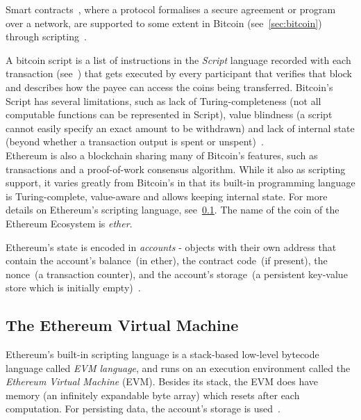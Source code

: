 Smart contracts~\cite{szabo1997smart-contracts}, where a protocol formalises a secure agreement or program over a
network, are supported to some extent in Bitcoin (see~\ref{sec:bitcoin}) through scripting~\cite{bitcoinwiki-scripts}.

A bitcoin script is a list of instructions in the \textit{Script} language recorded with each transaction
(see~) that gets executed by every participant that verifies that block and describes how the
payee can access the coins being transferred.
Bitcoin's Script has several limitations, such as lack of Turing-completeness (not all computable functions can be
represented in Script), value blindness (a script cannot easily specify an exact amount to be
withdrawn) and lack of internal state (beyond whether a transaction output is spent or
unspent)~\cite{buterin2015ethereum}.\\

Ethereum is also a blockchain sharing many of Bitcoin's features, such as transactions and
a proof-of-work consensus algorithm.
While it also as scripting support, it varies greatly from Bitcoin's in that its built-in programming language is
Turing-complete, value-aware and allows keeping internal state.
For more details on Ethereum's scripting language, see~\ref{subsec:eth:contract_langs}.
The name of the coin of the Ethereum Ecosystem is \textit{ether}.

Ethereum's state is encoded in \textit{accounts} - objects with their own address that contain the account's
balance~(in ether), the contract code~(if present), the nonce~(a transaction counter), and the account's
storage~(a persistent key-value store which is initially empty)~\cite{buterin2015ethereum}.\\


\subsection{The Ethereum Virtual Machine}\label{subsec:eth:contract_langs}

Ethereum's built-in scripting language is a stack-based low-level bytecode language called \textit{EVM language},
and runs on an execution environment called the \textit{Ethereum Virtual Machine} (EVM).
Besides its stack, the EVM does have memory (an infinitely expandable byte array) which resets after each computation.
For persisting data, the account's storage is used~\cite{buterin2015ethereum}. \\

